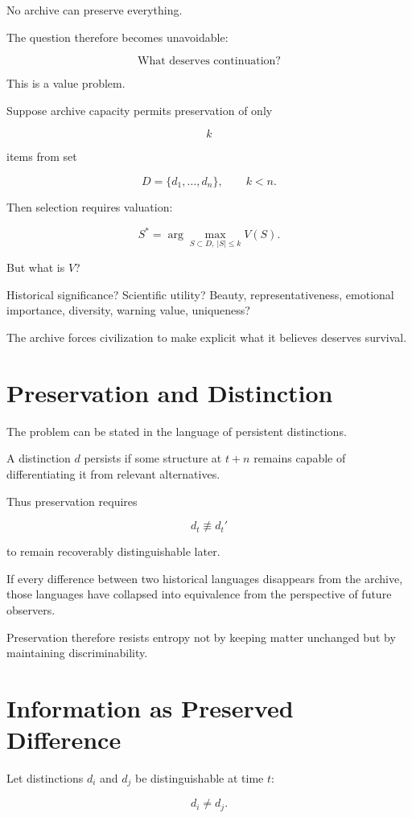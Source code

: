 \documentclass[11pt,oneside]{book}
\theoremstyle{definition}
\theoremstyle{remark}
\begin{document}
No archive can preserve everything.

The question therefore becomes unavoidable:

\[
\text{What deserves continuation?}
\]

This is a value problem.

Suppose archive capacity permits preservation of only

\[
k
\]

items from set

\[
D=\{d_1,\ldots,d_n\},
\qquad
k<n.
\]

Then selection requires valuation:

\[
S^\ast
=
\arg\max_{S\subset D,\ |S|\leq k}
V(S).
\]

But what is \(V\)?

Historical significance? Scientific utility? Beauty, representativeness, emotional importance, diversity, warning value, uniqueness?

The archive forces civilization to make explicit what it believes deserves survival.

\section{Preservation and Distinction}

The problem can be stated in the language of persistent distinctions.

A distinction \(d\) persists if some structure at \(t+n\) remains capable of differentiating it from relevant alternatives.

Thus preservation requires

\[
d_t
\not\equiv
d_t'
\]

to remain recoverably distinguishable later.

If every difference between two historical languages disappears from the archive, those languages have collapsed into equivalence from the perspective of future observers.

Preservation therefore resists entropy not by keeping matter unchanged but by maintaining discriminability.

\section{Information as Preserved Difference}

Let distinctions \(d_i\) and \(d_j\) be distinguishable at time \(t\):

\[
d_i\neq d_j.
\]
\end{document}
